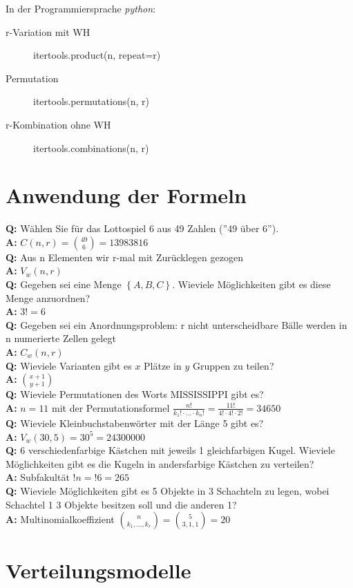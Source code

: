 \documentclass[a4paper,twocolumn]{article}
\newcommand{\set}[1]{\left\{#1\right\}}
\begin{document}
In der Programmiersprache \emph{python}:

\begin{description}
  \item[r-Variation mit WH]    itertools.product(n, repeat=r)
  \item[Permutation]           itertools.permutations(n, r)
  \item[r-Kombination ohne WH] itertools.combinations(n, r)
\end{description}


\section{Anwendung der Formeln}
\newcommand{\Q}[1]{\noindent\textbf{Q:} #1\\}
\newcommand{\A}[1]{\noindent\textbf{A:} #1\\}

\Q{Wählen Sie für das Lottospiel 6 aus 49 Zahlen (''49 über 6'').}
\A{$C(n, r) = {49 \choose 6} = 13983816$}

\Q{Aus n Elementen wir r-mal mit Zurücklegen gezogen}
\A{$V_w(n, r)$}

\Q{Gegeben sei eine Menge $\set{A, B, C}$. Wieviele Möglichkeiten gibt
    es diese Menge anzuordnen?}
\A{$3! = 6$}

\Q{Gegeben sei ein Anordnungsproblem: r nicht unterscheidbare Bälle
    werden in n numerierte Zellen gelegt}
\A{$C_w(n, r)$}

\Q{Wieviele Varianten gibt es $x$ Plätze in $y$ Gruppen zu teilen?}
\A{${x+1 \choose y+1}$}

\Q{Wieviele Permutationen des Worts MISSISSIPPI gibt es?}
\A{$n=11$ mit der Permutationsformel $\frac{n!}{k_1!\cdot\ldots\cdot k_n!}
    = \frac{11!}{4!\cdot 4!\cdot 2!} = 34650$}

\Q{Wieviele Kleinbuchstabenwörter mit der Länge 5 gibt es?}
\A{$V_w(30, 5) = 30^5 = 24300000$}

\Q{6 verschiedenfarbige Kästchen mit jeweils 1 gleichfarbigen Kugel.
   Wieviele Möglichkeiten gibt es die Kugeln in andersfarbige Kästchen
   zu verteilen?}
\A{Subfakultät $!n = !6 = 265$}

\Q{Wieviele Möglichkeiten gibt es 5 Objekte in 3 Schachteln zu legen,
    wobei Schachtel 1 3 Objekte besitzen soll und die anderen 1?}
\A{Multinomialkoeffizient ${n \choose k_1,\ldots,k_r} = {5 \choose 3,1,1}
    = 20$}

\newpage
\section{Verteilungsmodelle}
\end{document}
